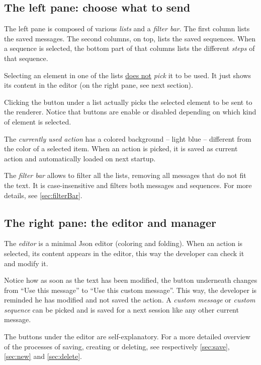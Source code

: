 \documentclass[11pt]{refart}
\newcommand*{\textAtt}[1]{\attention\underline{#1}}
\begin{document}
\subsection*{The left pane: choose what to send}
\label{sec:leftPane}

The left pane is composed of various \emph{lists} and a \emph{filter bar}.
The first column lists the saved messages.
The second columns, on top, lists the saved sequences.
When a sequence is selected, the bottom part of that columns lists the different \emph{steps} of that sequence.

Selecting an element in one of the lists \textAtt{does not} \emph{pick} it to be used.
It just shows its content in the editor (on the right pane, see next section).

Clicking the button under a list actually picks the selected element to be sent to the renderer. 
Notice that buttons are enable or disabled depending on which kind of element is selected.

The \emph{currently used action} has a colored background -- light blue -- different from the color of a selected item.
When an action is picked, it is saved as current action and automatically loaded on next startup.

The \emph{filter bar} allows to filter all the lists, removing all messages that do not fit the text.
It is case-insensitive and filters both messages and sequences.
For more details, see \ref{sec:filterBar}.

\subsection*{The right pane: the editor and manager}
\label{sec:rightPane}

The \emph{editor} is a minimal Json editor (coloring and folding). 
When an action is selected, its content appears in the editor, this way the developer can check it and modify it.

\attention Notice how as soon as the text has been modified, the button underneath changes from ``Use this message'' to ``Use this custom message''. 
This way, the developer is reminded he has modified and not saved the action. 
A \emph{custom message} or \emph{custom sequence} can be picked and is saved for a next session like any other current message.

The buttons under the editor are self-explanatory.
For a more detailed overview of the processes of saving, creating or deleting, see respectively \ref{sec:save}, \ref{sec:new} and \ref{sec:delete}.
\end{document}
